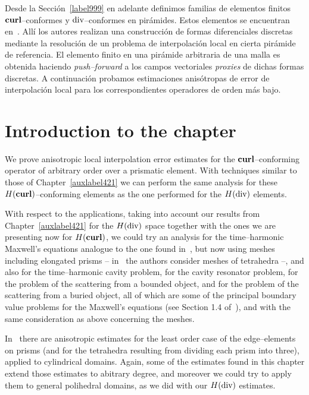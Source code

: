 Desde la Secci\'on~\ref{label999} en adelante definimos
familias de elementos finitos 
$\textbf{curl}$--conformes y $\operatorname{\textrm{div}}$--conformes en pi\-r\'ami\-des. Estos elementos
se encuentran en~\cite{gh99}. All\'i los autores
realizan una construcci\'on de formas diferenciales discre\-tas
mediante la resoluci\'on de un problema de interpolaci\'on local
en cierta pi\-r\'ami\-de de referencia. El elemento finito en una
pi\-r\'ami\-de arbitraria de una malla es obtenida haciendo \emph{push--forward} a
los campos vectoriales \emph{proxies} de dichas formas discre\-tas.
A continuaci\'on probamos estimaciones anis\'otropas de error de interpolaci\'on
local para los correspondientes operadores de orden m\'as bajo.

\section*{Introduction to the chapter}

We prove anisotropic local interpolation error estimates for the
$\textbf{curl}$--con\-for\-ming operator of arbitrary order over a prismatic element.
With techniques similar to those of Chapter~\ref{auxlabel421} we can
perform the same analysis for these $H(\textbf{curl})$--con\-for\-ming elements
as the one performed for the $H(\operatorname{\textrm{div}})$ elements.

With respect to the applications,
taking into account our results 
from Chapter~\ref{auxlabel421}
for the $H(\operatorname{\textrm{div}})$ space together with the ones we are presenting now
for $H(\textbf{curl})$, we could try an analysis for the
time--harmonic Maxwell's equations analogue to the one found
in~\cite{buffaCostabelDauge}, but now using meshes including
elongated prisms -- in~\cite{buffaCostabelDauge} the authors consider
meshes of tetrahedra --, and also for the time--harmonic cavity problem,
for the cavity resonator problem, for the problem of the scattering from a 
bounded object, and for the problem of the scattering from a
buried object, all of which are some of the principal boundary value
problems for the Maxwell's equations (see Section 1.4 of~\cite{monk}),
and with the same consideration as above concerning the meshes.

In~\cite{MR1860445} there are anisotropic estimates for 
the least order case of the edge--elements on prisms
(and for the tetrahedra resulting from dividing each prism into three),
applied to cylindrical domains.
Again, some of the estimates found in this chapter extend those estimates
to abitrary degree, and moreover we could try to apply them
to general polihedral domains, as we did with our $H(\operatorname{\textrm{div}})$ estimates.

